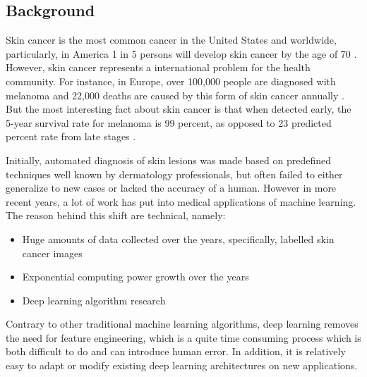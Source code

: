 \documentclass[journal,compsoc]{IEEEtran}
\begin{document}
\subsection{Background}
Skin cancer is the most common cancer in the United States and worldwide, particularly, in America 1 in 5 persons will develop skin cancer by the age of 70 \cite{Foundation2019}. However, skin cancer represents a international problem for the health community. For instance, in Europe, over 100,000 people are diagnosed with melanoma and 22,000  deaths are caused by this form of skin cancer annually \cite{Bray2018}.  But the most interesting fact about skin cancer is that when detected early, the 5-year survival rate for melanoma is 99 percent, as opposed to 23 predicted percent rate from late stages \cite{Foundation2019}. \par
Initially, automated diagnosis of skin lesions was made based on predefined techniques well known by dermatology professionals, but often failed to either generalize to new cases or lacked the accuracy of a human. However in more recent years, a lot of work has put into medical applications of machine learning. The reason behind this shift are technical, namely: \par
\begin{itemize}
\item Huge amounts of data collected over the years, specifically, labelled skin cancer images
\item Exponential computing power growth over the years 
\item Deep learning algorithm research
\end{itemize}
Contrary to other traditional machine learning algorithms, deep learning removes the need for feature engineering, which is a quite time consuming process which is both difficult to do and can introduce human error. In addition, it is relatively easy to adapt or modify existing deep learning architectures on new applications.
\end{document}
